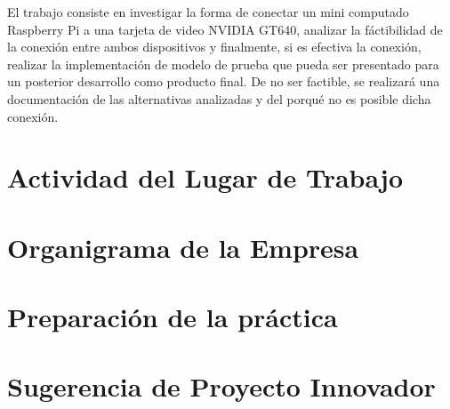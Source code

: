 \documentclass[11pt,oneside]{article}
\begin{document}
El trabajo consiste en investigar la forma de conectar un mini computado Raspberry Pi a una tarjeta de video NVIDIA GT640, analizar la fáctibilidad de la conexión entre ambos dispositivos y finalmente, si es efectiva la conexión, realizar la implementación de modelo de prueba que pueda ser presentado para un posterior desarrollo como producto final. De no ser factible,  se realizará una documentación de las alternativas analizadas y del porqué no es posible dicha conexión. 

\section{Actividad del Lugar de Trabajo}
\begin{comment}
Describa la misión de la empresa, los procesos o funciones que se realizan en su lugar de trabajo, los proyectos que se están desarrollando, los problemas que se están enfrentando, etc.
\end{comment}
\section{Organigrama de la Empresa}
\begin{comment}
Incluir un diagrama con la organización interna de la empresa, que permita localizar el área o sección donde realizó la práctica.
\end{comment}

\section{Preparaci\'on de la pr\'actica}
\begin{comment}
Indique los tópicos, entre los que ha cursado hasta el momento, más requeridos durante el desarrollo de la práctica, y los que le hicieron falta para un mejor desempeño.
\end{comment}
\section{Sugerencia de Proyecto Innovador}
\begin{comment}
En no más de una página, sugiera usted formas de optimizar las tareas que se realizan, o un proyecto de modernización, modificación, expansión, desarrollo o investigación posible para la empresa.
\end{comment}
\end{document}
